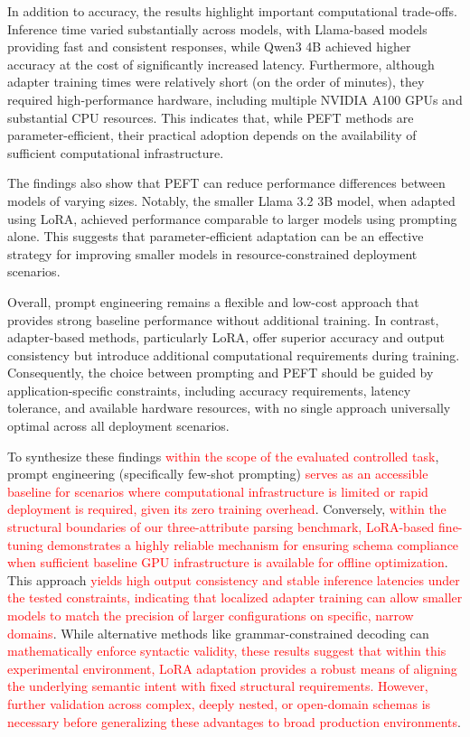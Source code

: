 \documentclass[journal,article,submit,pdftex,moreauthors]{Definitions/mdpi}
\begin{document}
In addition to accuracy, the results highlight important computational trade-offs. Inference time varied substantially across models, with Llama-based models providing fast and consistent responses, while Qwen3 4B achieved higher accuracy at the cost of significantly increased latency. Furthermore, although adapter training times were relatively short (on the order of minutes), they required high-performance hardware, including multiple NVIDIA A100 GPUs and substantial CPU resources. This indicates that, while PEFT methods are parameter-efficient, their practical adoption depends on the availability of sufficient computational infrastructure.

The findings also show that PEFT can reduce performance differences between models of varying sizes. Notably, the smaller Llama 3.2 3B model, when adapted using LoRA, achieved performance comparable to larger models using prompting alone. This suggests that parameter-efficient adaptation can be an effective strategy for improving smaller models in resource-constrained deployment scenarios.

Overall, prompt engineering remains a flexible and low-cost approach that provides strong baseline performance without additional training. In contrast, adapter-based methods, particularly LoRA, offer superior accuracy and output consistency but introduce additional computational requirements during training. Consequently, the choice between prompting and PEFT should be guided by application-specific constraints, including accuracy requirements, latency tolerance, and available hardware resources, with no single approach universally optimal across all deployment scenarios.

To synthesize these findings \textcolor{red}{within the scope of the evaluated controlled task}, prompt engineering (specifically few-shot prompting) \textcolor{red}{serves as an accessible baseline for scenarios where computational infrastructure is limited or rapid deployment is required, given its zero training overhead}. Conversely, \textcolor{red}{within the structural boundaries of our three-attribute parsing benchmark, LoRA-based fine-tuning demonstrates a highly reliable mechanism for ensuring schema compliance when sufficient baseline GPU infrastructure is available for offline optimization}. This approach \textcolor{red}{yields high output consistency and stable inference latencies under the tested constraints, indicating that localized adapter training can allow smaller models to match the precision of larger configurations on specific, narrow domains}. While alternative methods like grammar-constrained decoding can \textcolor{red}{mathematically enforce syntactic validity, these results suggest that within this experimental environment, LoRA adaptation provides a robust means of aligning the underlying semantic intent with fixed structural requirements. However, further validation across complex, deeply nested, or open-domain schemas is necessary before generalizing these advantages to broad production environments}.
\vspace{6pt} 
\end{document}
